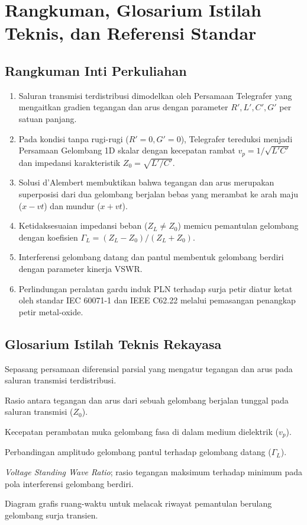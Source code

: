 \documentclass[11pt,a4paper]{article}
\theoremstyle{definition}
\begin{document}
\section{Rangkuman, Glosarium Istilah Teknis, dan Referensi Standar}

\subsection{Rangkuman Inti Perkuliahan}
\begin{enumerate}[leftmargin=*]
    \item Saluran transmisi terdistribusi dimodelkan oleh Persamaan Telegrafer yang mengaitkan gradien tegangan dan arus dengan parameter $R', L', C', G'$ per satuan panjang.
    \item Pada kondisi tanpa rugi-rugi ($R'=0, G'=0$), Telegrafer tereduksi menjadi Persamaan Gelombang 1D skalar dengan kecepatan rambat $v_p = 1/\sqrt{L'C'}$ dan impedansi karakteristik $Z_0 = \sqrt{L'/C'}$.
    \item Solusi d'Alembert membuktikan bahwa tegangan dan arus merupakan superposisi dari dua gelombang berjalan bebas yang merambat ke arah maju ($x - vt$) dan mundur ($x + vt$).
    \item Ketidaksesuaian impedansi beban ($Z_L \ne Z_0$) memicu pemantulan gelombang dengan koefisien $\Gamma_L = (Z_L - Z_0)/(Z_L + Z_0)$.
    \item Interferensi gelombang datang dan pantul membentuk gelombang berdiri dengan parameter kinerja VSWR.
    \item Perlindungan peralatan gardu induk PLN terhadap surja petir diatur ketat oleh standar IEC 60071-1 dan IEEE C62.22 melalui pemasangan penangkap petir metal-oxide.
\end{enumerate}

\subsection{Glosarium Istilah Teknis Rekayasa}
\begin{description}[leftmargin=!,labelwidth=3.5cm]
    \item[Telegrapher's Eq.] Sepasang persamaan diferensial parsial yang mengatur tegangan dan arus pada saluran transmisi terdistribusi.
    \item[Characteristic Impedance] Rasio antara tegangan dan arus dari sebuah gelombang berjalan tunggal pada saluran transmisi ($Z_0$).
    \item[Phase Velocity] Kecepatan perambatan muka gelombang fasa di dalam medium dielektrik ($v_p$).
    \item[Reflection Coeff.] Perbandingan amplitudo gelombang pantul terhadap gelombang datang ($\Gamma_L$).
    \item[VSWR] \textit{Voltage Standing Wave Ratio}; rasio tegangan maksimum terhadap minimum pada pola interferensi gelombang berdiri.
    \item[Bewley Lattice] Diagram grafis ruang-waktu untuk melacak riwayat pemantulan berulang gelombang surja transien.
\end{description}
\end{document}
